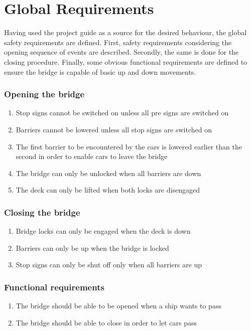 \section{Global Requirements}
\label{sec:glob}

Having used the project guide as a source for the desired behaviour, the global safety requirements are defined. First, safety requirements considering the opening sequence of events are described. Secondly, the same is done for the closing procedure. Finally, some obvious functional requirements are defined to ensure the bridge is capable of basic up and down movements.

\subsubsection*{Opening the bridge}
\begin{enumerate}
	\item Stop signs cannot be switched on unless all pre signs are switched on
	\item Barriers cannot be lowered unless all stop signs are switched on
	\item The first barrier to be encountered by the cars is lowered earlier than the second in order to enable cars to leave the bridge
	\item The bridge can only be unlocked when all barriers are down
	\item The deck can only be lifted when both locks are disengaged
	\setcounter{enumTemp}{\theenumi}
\end{enumerate}

\subsubsection*{Closing the bridge}
\begin{enumerate}
	\setcounter{enumi}{\theenumTemp}
	\item Bridge locks can only be engaged when the deck is down
	\item Barriers can only be up when the bridge is locked
	\item Stop signs can only be shut off only when all barriers are up
	\setcounter{enumTemp}{\theenumi}
\end{enumerate}

\subsubsection*{Functional requirements}
\begin{enumerate}
	\setcounter{enumi}{\theenumTemp}
	\item The bridge should be able to be opened when a ship wants to pass
	\item The bridge should be able to close in order to let cars pass
	\setcounter{enumTemp}{\theenumi}
\end{enumerate}


